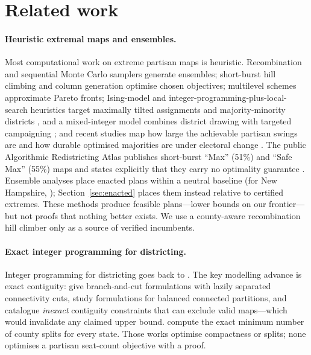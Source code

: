 \section{Related work}\label{sec:related}

\paragraph{Heuristic extremal maps and ensembles.}
Most computational work on extreme partisan maps is heuristic. Recombination and sequential Monte Carlo samplers \citep{deford2021,mccartan2023} generate ensembles; short-burst hill climbing \citep{cannon2023} and column generation \citep{gurnee2021} optimise chosen objectives; multilevel schemes \citep{swamy2023} approximate Pareto fronts; Ising-model and integer-programming-plus-local-search heuristics target maximally tilted assignments \citep{okamoto2021} and majority-minority districts \citep{brous2025}, and a mixed-integer model combines district drawing with targeted campaigning \citep{deshpande2023}; and recent studies map how large the achievable partisan swings are \citep{goedert2024} and how durable optimised majorities are under electoral change \citep{palmer2026}. The public Algorithmic Redistricting Atlas publishes short-burst ``Max'' (51\%) and ``Safe Max'' (55\%) maps and states explicitly that they carry no optimality guarantee \citep{atlas2026}. Ensemble analyses place enacted plans within a neutral baseline (for New Hampshire, \citealp{mcwhorter2026}); Section~\ref{sec:enacted} places them instead relative to certified extremes. These methods produce feasible plans---lower bounds on our frontier---but not proofs that nothing better exists. We use a county-aware recombination hill climber only as a source of verified incumbents.

\paragraph{Exact integer programming for districting.}
Integer programming for districting goes back to \citet{hess1965}. The key modelling advance is exact contiguity: \citet{validi2022} give branch-and-cut formulations with lazily separated connectivity cuts, \citet{miyazawa2021} study formulations for balanced connected partitions, and \citet{jolly2026} catalogue \emph{inexact} contiguity constraints that can exclude valid maps---which would invalidate any claimed upper bound. \citet{shahmizad2025} compute the exact minimum number of county splits for every state. Those works optimise compactness or splits; none optimises a partisan seat-count objective with a proof.

